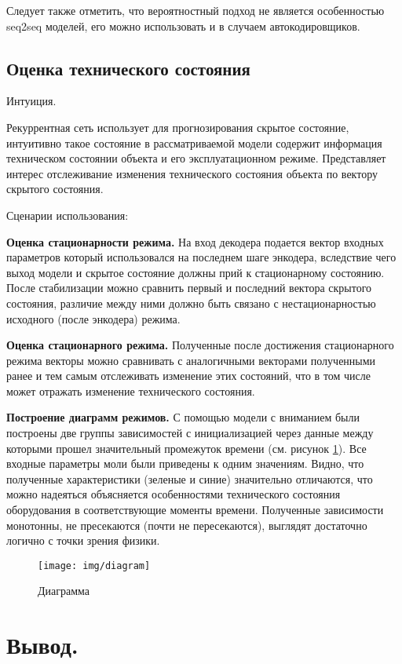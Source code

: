 \documentclass[12pt,a4paper]{article}
\begin{document}
 Следует также отметить, что вероятностный подход не является особенностью seq2seq моделей, его можно использовать и в случаем автокодировщиков.


\newpage
\subsection*{Оценка технического состояния}

Интуиция.

Рекуррентная сеть использует для прогнозирования скрытое состояние, интуитивно такое состояние в рассматриваемой модели содержит информация техническом состоянии объекта и его эксплуатационном режиме. Представляет интерес отслеживание изменения технического состояния объекта по вектору скрытого состояния.

Сценарии использования:

\textbf{Оценка стационарности режима. } На вход декодера подается вектор входных параметров который использовался на последнем шаге энкодера, вследствие чего выход модели и скрытое состояние должны прий к стационарному состоянию. После стабилизации можно сравнить первый и последний вектора скрытого состояния, различие между ними должно быть связано с нестационарностью исходного (после энкодера) режима.

\textbf{Оценка стационарного режима. } Полученные после достижения стационарного режима векторы можно сравнивать с аналогичными векторами полученными ранее и тем самым отслеживать изменение этих состояний, что в том числе может отражать изменение технического состояния. 

\textbf{Построение диаграмм режимов.} С помощью модели с вниманием были построены две группы зависимостей с инициализацией через данные между которыми прошел значительный промежуток времени (см. рисунок \ref{fig:diagram}). Все входные параметры моли были приведены к одним значениям. Видно, что полученные характеристики (зеленые и синие) значительно отличаются, что можно надеяться объясняется особенностями технического состояния оборудования в соответствующие моменты времени. Полученные зависимости монотонны, не пресекаются (почти не пересекаются), выглядят достаточно логично с точки зрения физики.

\begin{figure}[htbp]
	\centering\texttt{[image: img/diagram]}
	\caption{Диаграмма}
	\label{fig:diagram}
\end{figure}

\newpage
\section{Вывод.}
\end{document}
